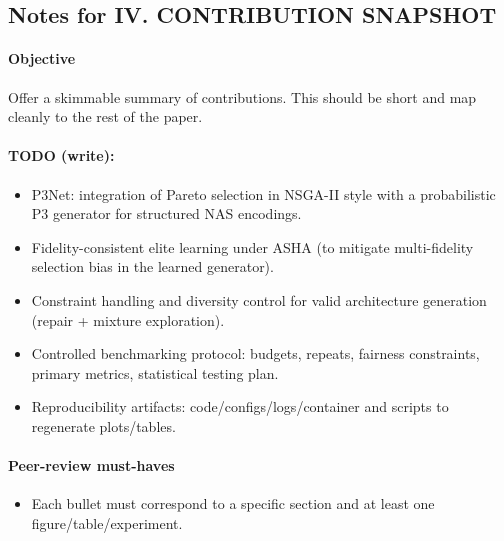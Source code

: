 \subsection*{Notes for IV. CONTRIBUTION SNAPSHOT}
\paragraph{Objective}
Offer a skimmable summary of contributions. This should be short and map cleanly to the rest of the paper.

\paragraph{TODO (write):}
\begin{itemize}
  \item P3Net: integration of Pareto selection in NSGA-II style with a probabilistic P3 generator for structured NAS encodings.
  \item Fidelity-consistent elite learning under ASHA (to mitigate multi-fidelity selection bias in the learned generator).
  \item Constraint handling and diversity control for valid architecture generation (repair + mixture exploration).
  \item Controlled benchmarking protocol: budgets, repeats, fairness constraints, primary metrics, statistical testing plan.
  \item Reproducibility artifacts: code/configs/logs/container and scripts to regenerate plots/tables.
\end{itemize}

\paragraph{Peer-review must-haves}
\begin{itemize}
  \item Each bullet must correspond to a specific section and at least one figure/table/experiment.
\end{itemize}
